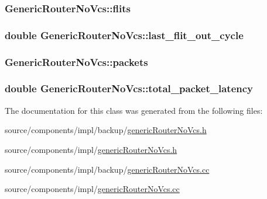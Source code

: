 \hypertarget{classGenericRouterNoVcs_f1f16a8fee993cd6287c8772300c1936}{
\subsubsection[{flits}]{ {\bf GenericRouterNoVcs::flits}}}
\label{classGenericRouterNoVcs_f1f16a8fee993cd6287c8772300c1936}


\hypertarget{classGenericRouterNoVcs_9dcc34984deb05947a392e063b4eb718}{
\subsubsection[{last\_\-flit\_\-out\_\-cycle}]{\setlength{\rightskip}{0pt plus 5cm}double {\bf GenericRouterNoVcs::last\_\-flit\_\-out\_\-cycle}}}
\label{classGenericRouterNoVcs_9dcc34984deb05947a392e063b4eb718}


\hypertarget{classGenericRouterNoVcs_dba7f3303be476622b197de24f8b4424}{
\subsubsection[{packets}]{ {\bf GenericRouterNoVcs::packets}}}
\label{classGenericRouterNoVcs_dba7f3303be476622b197de24f8b4424}


\hypertarget{classGenericRouterNoVcs_e0c46058ebe12608d9149609ca33e142}{
\subsubsection[{total\_\-packet\_\-latency}]{\setlength{\rightskip}{0pt plus 5cm}double {\bf GenericRouterNoVcs::total\_\-packet\_\-latency}}}
\label{classGenericRouterNoVcs_e0c46058ebe12608d9149609ca33e142}




The documentation for this class was generated from the following files:\begin{CompactItemize}
\item 
source/components/impl/backup/\hyperlink{backup_2genericRouterNoVcs_8h}{genericRouterNoVcs.h}\item 
source/components/impl/\hyperlink{genericRouterNoVcs_8h}{genericRouterNoVcs.h}\item 
source/components/impl/backup/\hyperlink{backup_2genericRouterNoVcs_8cc}{genericRouterNoVcs.cc}\item 
source/components/impl/\hyperlink{genericRouterNoVcs_8cc}{genericRouterNoVcs.cc}\end{CompactItemize}
